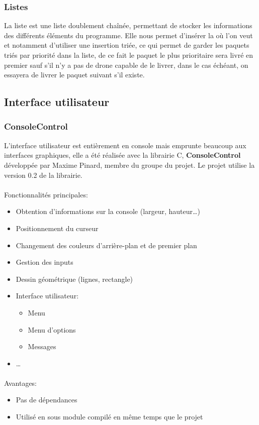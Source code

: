 \documentclass[article, backcover, french, nodocumentinfo]{upmethodology-document}
\begin{document}
			\subsubsection{Listes}
			La liste est une liste doublement chaînée, permettant de stocker les informations des différents éléments du programme.
			Elle nous permet d'insérer la où l'on veut et notamment d'utiliser une insertion triée, ce qui permet de garder les paquets
			triés par priorité dans la liste, de ce fait le paquet le plus prioritaire sera livré en premier sauf s'il n'y a pas de drone
			capable de le livrer, dans le cas échéant, on essayera de livrer le paquet suivant s'il existe.
		\subsection{Interface utilisateur}
			\subsubsection{ConsoleControl}
				L'interface utilisateur est entièrement en console mais emprunte beaucoup aux interfaces graphiques, elle a été réalisée avec la librairie C, \textbf{ConsoleControl} développée par Maxime Pinard, membre du groupe du projet. Le projet utilise la version 0.2 de la librairie.
				\paragraph*{}
					Fonctionnalités principales:
					\begin{itemize}
						\item Obtention d'informations sur la console (largeur, hauteur\ldots)
						\item Positionnement du curseur
						\item Changement des couleurs d'arrière-plan et de premier plan
						\item Gestion des inputs
						\item Dessin géométrique (lignes, rectangle)
						\item Interface utilisateur:
							\begin{itemize}
								\item Menu
								\item Menu d'options
								\item Messages
							\end{itemize}
						\item \ldots
					\end{itemize}
				\paragraph*{}
					Avantages:
					\begin{itemize}
						\item Pas de dépendances
						\item Utilisé en sous module compilé en même temps que le projet
					\end{itemize}
\end{document}
